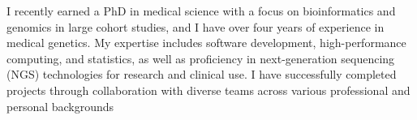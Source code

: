 \documentclass[9pt,a4paper,ragged2e,withhyper]{altacv}
\begin{document}


\makecvheader

I recently earned a PhD in medical science with a focus on bioinformatics and genomics in large cohort studies, and I have over four years of experience in medical genetics.
My expertise includes software development, high-performance computing, and statistics, as well as proficiency in next-generation sequencing (NGS) technologies for research and clinical use.
I have successfully completed projects through collaboration with diverse teams across various professional and personal backgrounds
\end{document}

